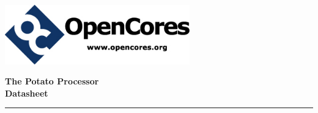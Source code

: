 \documentclass[10pt,a4paper]{article}
\begin{document}
\begin{minipage}{0.5\textwidth}
\raggedright
\includegraphics[width=0.6\textwidth]{opencores.png}
\end{minipage}
\begin{minipage}{0.5\textwidth}
\raggedleft\Large\bf
\textsf{The Potato Processor\\Datasheet}
\end{minipage}

\vspace{0.5em}
\noindent\rule{\linewidth}{1pt}\\
\end{document}
